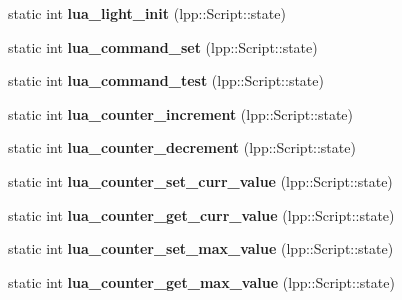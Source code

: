 \begin{DoxyCompactItemize}
\item 
static int {\bfseries lua\+\_\+light\+\_\+init} (lpp\+::\+Script\+::state)\hypertarget{class_lua_interface_a8a6442501ea5a6e4c0605054b1b73dd8}{}\label{class_lua_interface_a8a6442501ea5a6e4c0605054b1b73dd8}

\item 
static int {\bfseries lua\+\_\+command\+\_\+set} (lpp\+::\+Script\+::state)\hypertarget{class_lua_interface_a42484f2837f2f469cbc44f1621605178}{}\label{class_lua_interface_a42484f2837f2f469cbc44f1621605178}

\item 
static int {\bfseries lua\+\_\+command\+\_\+test} (lpp\+::\+Script\+::state)\hypertarget{class_lua_interface_ae2e08f3fb8d637e6115e366624310461}{}\label{class_lua_interface_ae2e08f3fb8d637e6115e366624310461}

\item 
static int {\bfseries lua\+\_\+counter\+\_\+increment} (lpp\+::\+Script\+::state)\hypertarget{class_lua_interface_ac4c368f65e86d0d50f10cff69ffdf415}{}\label{class_lua_interface_ac4c368f65e86d0d50f10cff69ffdf415}

\item 
static int {\bfseries lua\+\_\+counter\+\_\+decrement} (lpp\+::\+Script\+::state)\hypertarget{class_lua_interface_aef309bd3f4c5d26a15d98fbd79b83b7b}{}\label{class_lua_interface_aef309bd3f4c5d26a15d98fbd79b83b7b}

\item 
static int {\bfseries lua\+\_\+counter\+\_\+set\+\_\+curr\+\_\+value} (lpp\+::\+Script\+::state)\hypertarget{class_lua_interface_a58c4a41e2c23a257cbb8b62bfd49eb0e}{}\label{class_lua_interface_a58c4a41e2c23a257cbb8b62bfd49eb0e}

\item 
static int {\bfseries lua\+\_\+counter\+\_\+get\+\_\+curr\+\_\+value} (lpp\+::\+Script\+::state)\hypertarget{class_lua_interface_a843fb71e867279a938d3d8df517f04a0}{}\label{class_lua_interface_a843fb71e867279a938d3d8df517f04a0}

\item 
static int {\bfseries lua\+\_\+counter\+\_\+set\+\_\+max\+\_\+value} (lpp\+::\+Script\+::state)\hypertarget{class_lua_interface_af6739750155652dd8b178fe359db6bf6}{}\label{class_lua_interface_af6739750155652dd8b178fe359db6bf6}

\item 
static int {\bfseries lua\+\_\+counter\+\_\+get\+\_\+max\+\_\+value} (lpp\+::\+Script\+::state)\hypertarget{class_lua_interface_a977e3f7288c4b2a36cff79c8e48bcd6f}{}\label{class_lua_interface_a977e3f7288c4b2a36cff79c8e48bcd6f}

\end{DoxyCompactItemize}

